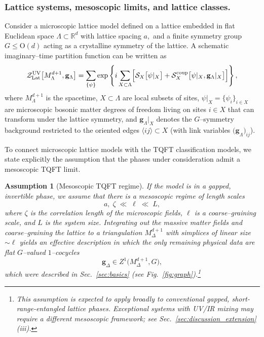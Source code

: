 \documentclass[aps,prx,reprint,superscriptaddress,twocolumn,amsmath,amssymb,amsfonts, nofootinbib]{revtex4-2}
\theoremstyle{apsstyle}
\newtheorem{assumption}{Assumption}
\begin{document}
\subsubsection{Lattice systems, mesoscopic limits, and lattice classes.}
Consider a microscopic lattice model defined on a lattice embedded in flat Euclidean space $\Lambda \subset \mathbb{R}^{d}$ with lattice spacing $a,$ and a finite symmetry group $G\le \mathrm{O}(d)$ acting as a crystalline symmetry of the lattice. A schematic imaginary–time partition function can be written as
\begin{equation}
    \mathcal{Z}^{\mathrm{UV}}_{\mathrm{Lat}}\bigl[M^{d+1}_\Lambda, {\mathbf g}_{\Lambda}\bigr]
    =\sum_{\{\psi\}} \exp\left\{
      i \sum_{X \subset \Lambda}
      \Bigl[\mathcal S_{X}\bigl[\psi\vert_{X}\bigr]
      + \mathcal{S}_{X}^{\mathrm{coup}}\bigl[\psi\vert_{X}, {\mathbf g}_{\Lambda}\vert_{X}\bigr] \Bigr]
    \right\},
    \label{eq:PF_lattice_UV}
\end{equation}
where $M^{d+1}_{\Lambda}$ is the spacetime, $X\subset \Lambda$ are local subsets of sites, $\psi\vert_X=\{\psi_i\}_{i\in X}$ are microscopic bosonic matter degrees of freedom living on sites $i\in X$ that can transform under the lattice symmetry, and ${\mathbf g}_{\Lambda}\vert_{X}$ denotes the $G$–symmetry background 
restricted to the oriented edges $\langle ij\rangle\subset X$ (with link variables ${(\mathbf g}_{\Lambda})_{ij}$).

\medskip

To connect microscopic lattice models with the TQFT classification models, we state explicitly the assumption that the phases under consideration admit a mesoscopic TQFT limit.
\begin{assumption}[Mesoscopic TQFT regime]
\label{assumption:mesoscopic_TQFT_description}
If the model is in a gapped, invertible phase, we assume that there is a mesoscopic regime of length scales
\begin{equation*}
    a ,\; \zeta \;\ll\; \ell \;\ll\; L,
\end{equation*}
where $\zeta$ is the correlation length of the microscopic fields, $\ell$ is a coarse–graining scale, and $L$ is the system size. Integrating out the massive matter fields and coarse–graining the lattice to a triangulation $M^{d+1}_{\Delta}$ with simplices of linear size $\sim \ell$ yields an effective description in which the only remaining physical data are flat $G$–valued $1$–cocycles
\begin{equation*}
    {\mathbf g}_{\Delta} \in Z^{1}\bigl(M^{d+1}_{\Delta}, G\bigr),
\end{equation*}
which were described in Sec.~\ref{sec:basics} (see Fig.~\ref{fig:graph}).\footnote{This assumption is expected to apply broadly to conventional gapped, short-range-entangled lattice phases. Exceptional systems with UV/IR mixing may require a different mesoscopic framework; see Sec.~\ref{sec:discussion_extension}(iii).}
\end{assumption}
\end{document}
